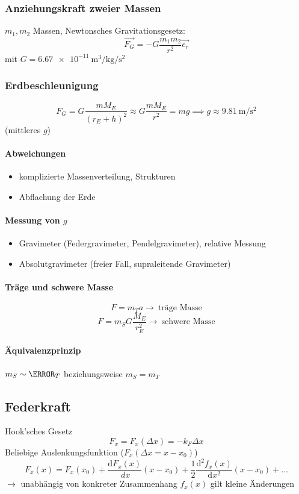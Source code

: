 \documentclass[a4paper]{scrartcl}
\renewcommand{\d}{\mathrm{d}}
\renewcommand{\v}[1]{\vec{#1}}
\newcommand{\dd}[2]{\frac{\d #1}{\ d#2}}
\theoremstyle{definition}
\theoremstyle{plain}
\theoremstyle{plain}
\theoremstyle{remark}
\theoremstyle{remark}
\theoremstyle{remark}
\begin{document}
\subsubsection{Anziehungskraft zweier Massen}
\label{sec-3-1-1}
$m_1,m_2$ Massen, Newtonsches Gravitationsgesetz:
\[\v{F_G} = -G\frac{m_1 m_2}{r^2}\v{e_r}\]
mit $G=\SI{6.67e-11}{\meter\cubed\per\kilo\gram\per\second\squared}$
\subsubsection{Erdbeschleunigung}
\label{sec-3-1-2}
\[F_G = G\frac{m M_E}{(r_E + h)^2} \approx G\frac{m M_E}{r^2} = m g \implies g\approx \SI{9.81}{\meter\per\second\squared}\]
(mittleres $g$) \\
\paragraph{Abweichungen}
\label{sec-3-1-2-1}
\begin{itemize}
\item komplizierte Massenverteilung, Strukturen
\item Abflachung der Erde
\end{itemize}
\paragraph{Messung von $g$}
\label{sec-3-1-2-2}
\begin{itemize}
\item Gravimeter (Federgravimeter, Pendelgravimeter), relative Messung
\item Absolutgravimeter (freier Fall, supraleitende Gravimeter)
\end{itemize}
\paragraph{Träge und schwere Masse}
\label{sec-3-1-2-3}
\[F= m_T a \rightarrow ~\text{träge Masse}\]
\[F= m_S G\frac{M_E}{r_E^2} \rightarrow ~\text{schwere Masse}\]
\paragraph{Äquivalenzprinzip}
\label{sec-3-1-2-4}
$m_S \sim \m_T$ beziehungsweise $m_S = m_T$
\subsection{Federkraft}
\label{sec-3-2}
Hook'sches Gesetz
\[F_x = F_x(\Delta x) = -k_F \Delta x\]
Beliebige Auslenkungsfunktion ($F_x(\Delta x = x - x_0)$)
\[F_x(x) = F_x(x_0) + \dd{F_x(x)}{x}(x-x_0) + \frac{1}{2}\frac{\d^2 f_x(x)}{\d x^2}(x - x_0) + \ldots\]
$\rightarrow$ unabhängig von konkreter Zusammenhang $f_x(x)$ gilt kleine Änderungen
\end{document}
